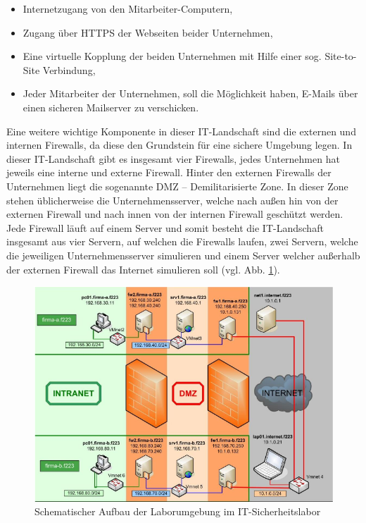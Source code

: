 \documentclass[
a4paper,     %
 headsepline, %
footsepline, %
titlepage,   %
 halfparskip,     %
 fleqn,       %
12pt         %
]{scrartcl}  %
\begin{document}
\begin{itemize}
\item Internetzugang von den Mitarbeiter-Computern,
\item Zugang über HTTPS der Webseiten beider Unternehmen,
\item Eine virtuelle Kopplung der beiden Unternehmen mit Hilfe einer sog. Site-to-Site Verbindung,
\item Jeder Mitarbeiter der Unternehmen, soll die Möglichkeit haben, E-Mails über einen sicheren  Mailserver zu verschicken.
\end{itemize}
Eine weitere wichtige Komponente in dieser IT-Landschaft sind die externen und internen Firewalls, da diese den Grundstein für eine sichere Umgebung legen. In dieser IT-Landschaft gibt es insgesamt vier Firewalls, jedes Unternehmen hat jeweils eine interne und externe Firewall. Hinter den externen Firewalls der Unternehmen liegt die sogenannte DMZ – Demilitarisierte Zone. In dieser Zone stehen üblicherweise die Unternehmensserver, welche nach außen hin von der externen Firewall und nach innen von der internen Firewall geschützt werden. Jede Firewall läuft auf einem Server und somit besteht die IT-Landschaft insgesamt aus vier Servern, auf welchen die Firewalls laufen, zwei Servern, welche die jeweiligen Unternehmensserver simulieren und einem Server welcher außerhalb der externen Firewall das Internet simulieren soll (vgl. Abb. \ref{fig:appStat}).

\begin{figure}[!h]
	\includegraphics[width=\textwidth]{pictures/laborumgebung.png}
	\caption{Schematischer Aufbau der Laborumgebung im IT-Sicherheitslabor \cite{JueNeuSaDue}}
	\label{fig:appStat}
\end{figure}
\end{document}
